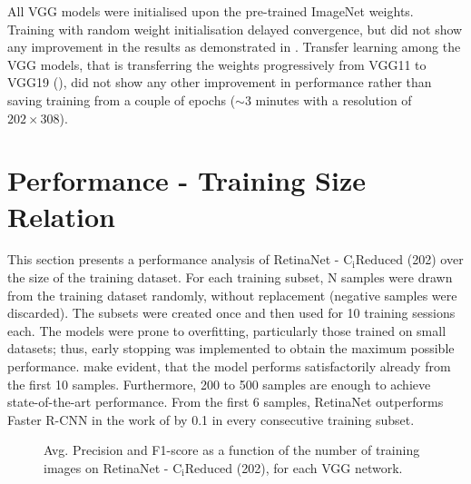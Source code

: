 All VGG models were initialised upon the pre-trained ImageNet weights. Training with random weight initialisation delayed convergence, but did not show any improvement in the results as demonstrated in \cite{bargoti2017deep}. Transfer learning among the VGG models, that is transferring the weights progressively from VGG11 to VGG19 (\cite{simonyan2014very}), did not show any other improvement in performance rather than saving training from a couple of epochs ($\sim3$ minutes with a resolution of $202\times308$).


\section{Performance - Training Size Relation}
This section presents a performance analysis of RetinaNet - $\text{C}_\text{i}\text{Reduced}$ (202)	over the size of the training dataset. For each training subset, N samples were drawn from the training dataset randomly, without replacement (negative samples were discarded). The subsets were created once and then used for 10 training sessions each. The models were prone to overfitting, particularly those trained on small datasets; thus, early stopping was implemented to obtain the maximum possible performance.  make evident, that the model performs satisfactorily already from the first 10 samples. Furthermore, 200 to 500 samples are enough to achieve state-of-the-art performance. From the first 6 samples, RetinaNet outperforms Faster R-CNN in the work of \cite{bargoti2017deep} by 0.1 in every consecutive training subset.

 \begin{figure}[!htb]
  \centering
  \caption{Avg. Precision and F1-score as a function of the number of training images on RetinaNet - $\text{C}_\text{i}\text{Reduced}$ (202), for each VGG network.}
  \label{fig9}
\end{figure}

